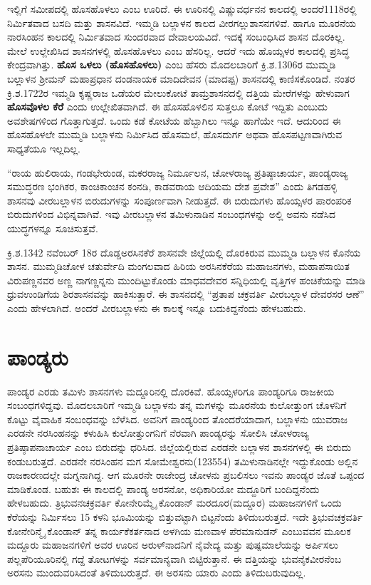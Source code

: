ಇಲ್ಲಿಗೆ ಸಮೀಪದಲ್ಲಿ ಹೊಸಹೊಳಲು ಎಂಬ ಊರಿದೆ. ಈ ಊರಿನಲ್ಲಿ ವಿಷ್ಣುವರ್ಧನನ ಕಾಲದಲ್ಲಿ ಅಂದರೆ1118ರಲ್ಲಿ ನಿರ್ಮಿತವಾದ ಬಸದಿ ಮತ್ತು ಶಾಸನವಿದೆ. ಇಮ್ಮಡಿ ಬಲ್ಲಾಳನ ಕಾಲದ ವೀರಗಲ್ಲುಶಾಸನಗಳಿವೆ. ಹಾಗೂ ಮೂರನೆಯ ನಾರಸಿಂಹನ ಕಾಲದಲ್ಲಿ ನಿರ್ಮಿತವಾದ ಸುಂದರವಾದ ದೇವಾಲಯವಿದೆ. ಇದಕ್ಕೆ ಸಂಬಂಧಿಸಿದ ಶಾಸನ ದೊರಕಿಲ್ಲ. ಮೇಲೆ ಉಲ್ಲೇಖಿಸಿದ ಶಾಸನಗಳಲ್ಲಿ ಹೊಸಹೊಳಲು ಎಂಬ ಹೆಸರಿಲ್ಲ. ಆದರೆ ಇದು ಹೊಯ್ಸಳರ ಕಾಲದಲ್ಲಿ ಪ್ರಸಿದ್ಧ ಕೇಂದ್ರವಾಗಿತ್ತು. \textbf{ಹೊಸ ಒಳಲು (ಹೊಸಹೊಳಲು)} ಎಂಬ ಹೆಸರು ಮೊದಲಬಾರಿಗೆ ಕ್ರಿ.ಶ.1306ರ ಮುಮ್ಮಡಿ ಬಲ್ಲಾಳನ ಶ‍್ರೀಮನ್​ ಮಹಾಪ್ರಧಾನ ದಂಡನಾಯಕ ಮಾದಿದೇವನ (ಮಾದಪ್ಪ) ಶಾಸನದಲ್ಲಿ ಕಾಣಿಸಕೊಂಡಿದೆ. ನಂತರ ಕ್ರಿ.ಶ.1722ರ ಇಮ್ಮಡಿ ಕೃಷ್ಣರಾಜ ಒಡೆಯರ ಮೇಲುಕೋಟೆ ತಾಮ್ರಶಾಸನದಲ್ಲಿ ದತ್ತಿಯ ಮೇರೆಗಳನ್ನು ಹೇಳುವಾಗ \textbf{ಹೊಸವೊಳಲ ಕೆರೆ} ಎಂದು ಉಲ್ಲೇಖಿತವಾಗಿದೆ. ಈ ಹೊಸಹೊಳಲಿನ ಸುತ್ತಲೂ ಕೋಟೆ ಇದ್ದಿತು ಎಂಬುದು ಅವಶೇಷಗಳಿಂದ ಗೊತ್ತಾಗುತ್ತದೆ. ಒಂದು ಕಡೆ ಕೋಟೆಯ ಹೆಬ್ಬಾಗಿಲು ಇನ್ನೂ ಹಾಗೆಯೇ ಇದೆ. ಆದುರಿಂದ ಈ ಹೊಸಹೊಳಲೇ ಮುಮ್ಮಡಿ ಬಲ್ಲಾಳನು ನಿರ್ಮಿಸಿದ ಹೊಸಮಲೆ, ಹೊಸದುರ್ಗ ಅಥವಾ ಹೊಸಪಟ್ಟಣವಾಗಿರುವ ಸಾಧ್ಯತೆಯೂ ಇಲ್ಲದಿಲ್ಲ.

“ರಾಯ ಹುಲಿರಾಯ, ಗಂಡಭೇರುಂಡ, ಮಕರರಾಜ್ಯ ನಿರ್ಮೂಲನ, ಚೋಳರಾಜ್ಯ ಪ್ರತಿಷ್ಠಾಚಾರ್ಯ, ಪಾಂಡ್ಯರಾಜ್ಯ ಸಮುದ್ಧರಣ ಭಂಗಿಕರ, ಕಾಂಚಿಕಾಂಚನ ಕಂನಡಿ, ಕಾಡವರಾಯ ಆದಿಯಮ ದೇಶ ಪ್ರವೇಶ” ಎಂದು ತಿಗಡಹಳ್ಳಿ ಶಾಸನವು ವೀರಬಲ್ಲಾಳನ ಬಿರುದುಗಳನ್ನು ಸಂಪೂರ್ಣವಾಗಿ ನೀಡುತ್ತದೆ. ಈ ಬಿರುದುಗಳು ಹೊಯ್ಸಳರ ಪಾರಂಪರಿಕ ಬಿರುದುಗಳಿಂದ ವಿಭಿನ್ನವಾಗಿವೆ. ಇವು ವೀರಬಲ್ಲಾಳನ ತಮಿಳುನಾಡಿನ ಸಂಬಂಧಗಳನ್ನು ಅಲ್ಲಿ ಅವನು ನಡೆಸಿದ ಯುದ್ಧಗಳನ್ನೂ ಸೂಚಿಸುತ್ತವೆ. 

ಕ್ರಿ.ಶ.1342 ನವೆಂಬರ್​ 18ರ ದೊಡ್ಡಅರಸಿನಕೆರೆ ಶಾಸನವೇ ಜಿಲ್ಲೆಯಲ್ಲಿ ದೊರಕಿರುವ ಮುಮ್ಮಡಿ ಬಲ್ಲಾಳನ ಕೊನೆಯ ಶಾಸನ. ಮುಮ್ಮಡಿಚೋಳ ಚತುರ್ವೇದಿ ಮಂಗಲವಾದ ಹಿರಿಯ ಅರಸಿನಕೆರೆಯ ಮಹಾಜನಗಳು, ಮಹಾಪಸಾಯಿತ ವಿರುಪಣ್ಣನವರ ಅಣ್ಣ ನಾಗಣ್ಣನ್ನನು ಮುಂದಿಟ್ಟುಕೊಂಡು ಮಾಧವದೇವರ ಸನ್ನಿಧಿಯಲ್ಲಿ ವೃತ್ತಿಗಳ ಹಂಚಿಕೆಯನ್ನು ಮಾಡಿ ಧ್ರುವಉಂಡಿಗೆಯ ಶಿರಶಾಸನವನ್ನು ಹಾಕಿಸುತ್ತಾರೆ. ಈ ಶಾಸನದಲ್ಲಿ “ಪ್ರತಾಪ ಚಕ್ರವರ್ತಿ ವೀರಬಲ್ಲಾಳ ದೇವರಸರ ಆಣೆ” ಎಂದು ಹೇಳಲಾಗಿದೆ. ಅಂದರೆ ವೀರಬಲ್ಲಾಳನು ಈ ಕಾಲಕ್ಕೆ ಇನ್ನೂ ಬದುಕಿದ್ದನೆಂದು ಹೇಳಬಹುದು.


\section{ಪಾಂಡ್ಯರು}

ಪಾಂಡ್ಯರ ಎರಡು ತಮಿಳು ಶಾಸನಗಳು ಮದ್ದೂರಿನಲ್ಲಿ ದೊರಕಿವೆ. ಹೊಯ್ಸಳರಿಗೂ ಪಾಂಡ್ಯರಿಗೂ ರಾಜಕೀಯ ಸಂಬಂಧಗಳಿ\-ದ್ದವು. ಮೊದಲಬಾರಿಗೆ ಇಮ್ಮಡಿ ಬಲ್ಲಾಳನು ತನ್ನ ಮಗಳನ್ನು ಮೂರನೆಯ ಕುಲೋತ್ತುಂಗ ಚೊಳನಿಗೆ ಕೊಟ್ಟು ವೈವಾಹಿಕ ಸಂಬಂಧವನ್ನು ಬೆಳೆಸಿದ. ಅವನಿಗೆ ಪಾಂಡ್ಯರಿಂದ ತೊಂದರೆಯಾದಾಗ, ಬಲ್ಲಾಳನು ಯುವರಾಜ ಎರಡನೇ ನರಸಿಂಹನನ್ನು ಕಳುಹಿಸಿ ಕುಲೋತ್ತುಂಗನಿಗೆ ನೆರವಾಗಿ ಪಾಂಡ್ಯರನ್ನು ಸೋಲಿಸಿ ಚೋಳರಾಜ್ಯ ಪ್ರತಿಷ್ಠಾಪನಾಚಾರ್ಯ ಎಂಬ ಬಿರುದನ್ನು ಧರಿಸಿದ. ಜಿಲ್ಲೆಯಲ್ಲಿರುವ ಎರಡನೇ ಬಲ್ಲಾಳನ ಶಾಸನಗಳಲ್ಲಿ ಈ ಬಿರುದು ಕಂಡುಬರುತ್ತದೆ. ಎರಡನೇ ನರಸಿಂಹನ ಮಗ ಸೋಮೇಶ್ವರನು(123554) ತಮಿಳುನಾಡಿನಲ್ಲೇ ಇದ್ದುಕೊಂಡು ಅಲ್ಲಿನ ರಾಜಕಾರಣದಲ್ಲೇ ಮಗ್ನನಾಗಿದ್ದ. ಆಗ ಮೂರನೇ ರಾಜೇಂದ್ರ ಚೋಳನು ಪ್ರಬಲಿಸಲು ಇವನು ಪಾಂಡ್ಯರ ಜೊತೆ ಒಪ್ಪಂದ ಮಾಡಿಕೊಂಡ. ಬಹುಶಃ ಈ ಕಾಲದಲ್ಲಿ ಪಾಂಡ್ಯ ಅರಸನೋ, ಅಧಿಕಾರಿಯೋ ಮದ್ದೂರಿಗೆ ಬಂದಿದ್ದನೆಂದು ಹೇಳಬಹುದು. ತ್ರಿಭುವನಚಕ್ರವರ್ತಿ ಕೋನೇರಿಮ್ಮೈ ಕೊಂಡಾನ್​ ಮರದೂರ(ಮದ್ದೂರ) ಮಹಾಜನಗಳಿಗೆ ಒಂದು ಕೆರೆಯನ್ನು ನಿರ್ಮಿಸಲು 15 ಕಳನಿ ಭೂಮಿಯನ್ನು ಬಿತ್ತುವಟ್ಟಾಗಿ ಬಿಟ್ಟನೆಂದು ತಿಳಿದುಬರುತ್ತದೆ. ಇದೇ ತ್ರಿಭುವಚಕ್ರವರ್ತಿ ಕೋನೇರಿನ್ಮೈ ಕೊಂಡಾನ್​ ತನ್ನ ಕಾರ್ಯಕೆಕರ್ತನಾದ ಅಳಗಿಯ ಮಣವಾಳ ಪೆರಮಾನುಡನ್​ ಎಂಬುವವನ ಮೂಲಕ ಮದ್ದೂರು ಮಹಾಜನಗಳಿಗೆ ಅವರ ಊರಿನ ಅರುಳ್​ನಾದನಿಗೆ ನೈವೇದ್ಯ ಮತ್ತು ಪುಷ್ಪಮಾಲೆಯನ್ನು ಅರ್ಪಿಸಲು ಪಲ್ಲಪೆರಿಯೂರಿನಲ್ಲಿ ಗದ್ದೆ ತೋಟಗಳನ್ನು ಸರ್ವಮಾನ್ಯವಾಗಿ ಬಿಟ್ಟಿರುತ್ತಾನೆ. ಈ ದತ್ತಿಯನ್ನು ಭುವನೈಕವೀರನೆಂಬ ಅರಸನು ಮುಂದುವರಿಸಿದಂತೆ ತಿಳಿದುಬರುತ್ತದೆ. ಈ ಅರಸನು ಯಾರು ಎಂದು ತಿಳಿದುಬರುವುದಿಲ್ಲ.


